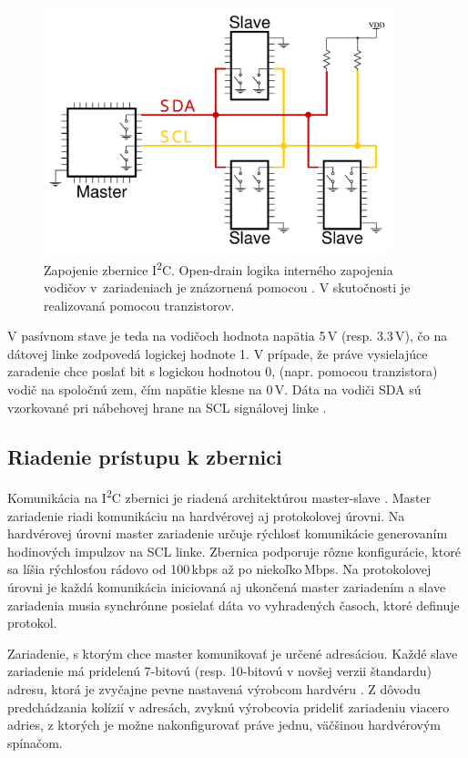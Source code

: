 \begin{figure}
    \centerline{\includegraphics[width=0.9\textwidth]{images/i2cWiring.pdf}}
    \caption[Zapojenie zbernice I\textsuperscript{2}C]{Zapojenie zbernice I\textsuperscript{2}C. Open-drain logika interného zapojenia vodičov v~zariadeniach je znázornená pomocou . V skutočnosti je realizovaná pomocou tranzistorov.}
    \label{obr:i2cWiring}
\end{figure}

V pasívnom stave je teda na vodičoch hodnota napätia 5\,V (resp. 3.3\,V), čo na dátovej linke zodpovedá logickej hodnote 1. V prípade, že práve vysielajúce zaradenie chce poslať bit s logickou hodnotou 0,  (napr. pomocou tranzistora) vodič na spoločnú zem, čím napätie klesne na 0\,V. Dáta na vodiči SDA sú vzorkované pri nábehovej hrane na SCL signálovej linke \cite{i2cSpec}.

\subsection{Riadenie prístupu k zbernici}
Komunikácia na I\textsuperscript{2}C zbernici je riadená architektúrou master-slave \cite{i2cSpec}. Master zariadenie riadi komunikáciu na hardvérovej aj protokolovej úrovni. Na hardvérovej úrovni master zariadenie určuje rýchlosť komunikácie generovaním hodinových impulzov na SCL linke. Zbernica podporuje rôzne konfigurácie, ktoré sa líšia rýchlosťou rádovo od 100\,kbps až po niekoľko\,Mbps. Na protokolovej úrovni je každá komunikácia iniciovaná aj ukončená master zariadením a slave zariadenia musia synchrónne posielať dáta vo vyhradených časoch, ktoré definuje protokol.

Zariadenie, s ktorým chce master komunikovať je určené adresáciou. Každé slave zariadenie má pridelenú 7-bitovú (resp. 10-bitovú v novšej verzii štandardu) adresu, ktorá je zvyčajne pevne nastavená výrobcom hardvéru \cite{i2cSpec}. Z dôvodu predchádzania kolízií v adresách, zvyknú výrobcovia prideliť zariadeniu viacero adries, z ktorých je možne nakonfigurovať práve jednu, väčšinou hardvérovým spínačom.

